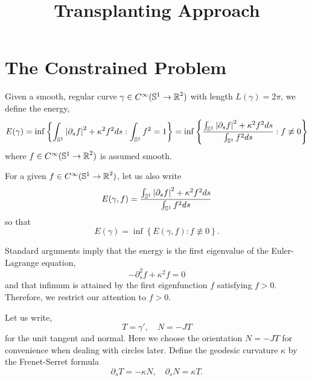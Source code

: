 \documentclass[12pt]{article}
\title{Transplanting Approach}
\date{}
\begin{document}
\maketitle

\section{The Constrained Problem}

Given a smooth, regular curve \(\gamma \in C^{\infty}(\operatorname{\mathbb{S}^1} \to \operatorname{\mathbb{R}}^2)\) with length \(L(\gamma) = 2\pi\), we define the energy,
\begin{equation}
\label{eq:Egamma}
E(\gamma) = \inf\left\{\int_{\operatorname{\mathbb{S}^1}} \left|{\partial_s f}\right|^2 + \kappa^2 f^2 ds : \int_{\operatorname{\mathbb{S}^1}} f^2 = 1\right\} = \inf\left\{\frac{\int_{\operatorname{\mathbb{S}^1}} \left|{\partial_s f}\right|^2 + \kappa^2 f^2 ds}{\int_{\operatorname{\mathbb{S}^1}} f^2 ds} : f \not\equiv 0\right\}
\end{equation}
where \(f \in C^{\infty}(\operatorname{\mathbb{S}^1} \to \operatorname{\mathbb{R}}^2)\) is assumed smooth.

For a given \(f \in C^{\infty}(\operatorname{\mathbb{S}^1} \to \operatorname{\mathbb{R}}^2)\), let us also write
\begin{equation}
\label{eq:Egammaf}
E(\gamma, f) = \frac{\int_{\operatorname{\mathbb{S}^1}} \left|{\partial_s f}\right|^2 + \kappa^2 f^2 ds}{\int_{\operatorname{\mathbb{S}^1}} f^2 ds}
\end{equation}
so that
\begin{equation}
\label{eq:EgammaEgammaf}
E(\gamma) = \inf\left\{E(\gamma, f) : f \not\equiv 0\right\}.
\end{equation}

Standard arguments imply that the energy is the first eigenvalue of the Euler-Lagrange equation,
\begin{equation}
\label{eq:ELf}
-\partial_s^2 f + \kappa^2 f = 0
\end{equation}
and that infimum is attained by the first eigenfunction \(f\) satisfying \(f > 0\). Therefore, we restrict our attention to \(f > 0\).

Let us write,
\begin{equation}
\label{eq:TN}
T = \gamma', \quad N = -J T
\end{equation}
for the unit tangent and normal. Here we choose the orientation \(N = -JT\) for convenience when dealing with circles later. Define the geodesic curvature \(\kappa\) by the Frenet-Serret formula
\begin{equation}
\label{eq:FS}
\partial_s T = - \kappa N, \quad \partial_s N = \kappa T.
\end{equation}
\end{document}
